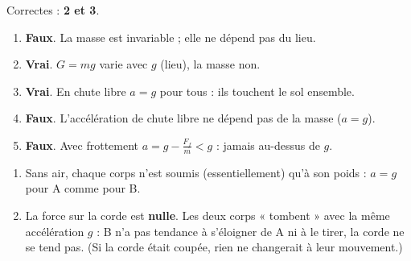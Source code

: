 \documentclass[11pt,a4paper]{article}
\begin{document}
\begin{corrige}
Correctes : \textbf{2 et 3}.
\begin{enumerate}[label=\arabic*.]
  \item \textbf{Faux}. La masse est invariable ; elle ne dépend pas du lieu.
  \item \textbf{Vrai}. $G=mg$ varie avec $g$ (lieu), la masse non.
  \item \textbf{Vrai}. En chute libre $a=g$ pour tous : ils touchent le sol ensemble.
  \item \textbf{Faux}. L'accélération de chute libre ne dépend pas de la masse ($a=g$).
  \item \textbf{Faux}. Avec frottement $a=g-\tfrac{F_f}{m}<g$ : jamais au-dessus de $g$.
\end{enumerate}
\end{corrige}

\begin{corrige}
\begin{enumerate}[label=\alph*)]
  \item Sans air, chaque corps n'est soumis (essentiellement) qu'à son poids : $a=g$ pour A comme pour B.
  \item La force sur la corde est \textbf{nulle}. Les deux corps « tombent » avec la même accélération $g$ :
        B n'a pas tendance à s'éloigner de A ni à le tirer, la corde ne se tend pas. (Si la corde était
        coupée, rien ne changerait à leur mouvement.)
\end{enumerate}
\end{corrige}
\end{document}
